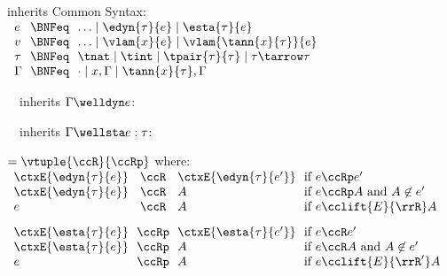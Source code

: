 \begin{flushleft}

 inherits Common Syntax:\\
$\begin{array}{l@{~~}c@{~~}l}
  e & \BNFeq & \ldots \mid \edyn{\tau}{e} \mid \esta{\tau}{e}
\\
  v & \BNFeq & \ldots \mid \vlam{x}{e} \mid \vlam{\tann{x}{\tau}}{e}
\\
  \tau & \BNFeq & \tnat \mid \tint \mid \tpair{\tau}{\tau} \mid \tau \tarrow \tau
\\
  \Gamma & \BNFeq & \cdot \mid x,\Gamma \mid \tann{x}{\tau},\Gamma
\end{array}$

\medskip
\begin{minipage}[t]{0.5\columnwidth}
~~inherits $\Gamma \welldyn e$:\\
\begin{mathpar}
\end{mathpar}
\end{minipage}%
\begin{minipage}[t]{0.5\columnwidth}
~~inherits $\Gamma \wellsta e : \tau$:\\
\begin{mathpar}

\end{mathpar}
\end{minipage}

\medskip
{} $= \vtuple{\ccR}{\ccRp}$ where:\\
$\begin{array}{l@{~~}c@{~~}l@{~~}l}
\ctxE{\edyn{\tau}{e}} & \ccR & \ctxE{\edyn{\tau}{e'}}
  & \mbox{if $e \ccRp e'$}
\\
\ctxE{\edyn{\tau}{e}} & \ccR & A
  & \mbox{if $e \ccRp A$ and $A \not\in e'$}
\\
e & \ccR & A
  & \mbox{if $e \cclift{E}{\rrR} A$}
\\[2ex]
\ctxE{\esta{\tau}{e}} & \ccRp & \ctxE{\esta{\tau}{e'}}
 & \mbox{if $e \ccR e'$}
\\
\ctxE{\esta{\tau}{e}} & \ccRp & A
 & \mbox{if $e \ccR A$ and $A \not\in e'$}
\\
e & \ccRp & A
 & \mbox{if $e \cclift{E}{\rrR'} A$}
\end{array}$

\end{flushleft}
